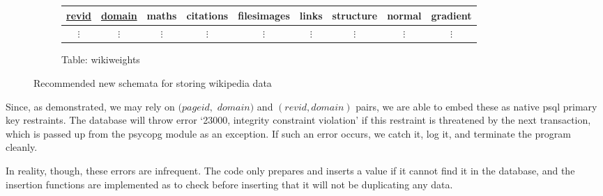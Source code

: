 \begin{figure}
\begin{subfigure}[b!]{\linewidth}
    \centering
    \begin{tabular}{ccccccccc}
      \toprule
      \underline{revid} & \underline{domain} & maths & citations & filesimages & links &
      structure & normal & gradient\\
      \midrule
      $\vdots$ & $\vdots$ & $\vdots$ & $\vdots$ & $\vdots$ & $\vdots$ &
      $\vdots$ & $\vdots$ & $\vdots$ \\
    \end{tabular}
    \caption{Table: wikiweights} 
  \end{subfigure}
  \caption{Recommended new schemata for storing wikipedia data}
  \label{fig:database-new}
\end{figure}

Since, as demonstrated, we may rely on $(pageid,$ $domain)$ and
$(revid,domain)$ pairs, we are able to embed these as native psql
primary key restraints. The database will throw error `23000,
integrity constraint violation' if this restraint is threatened by the
next transaction, which is passed up from the psycopg module as an
exception.\cite{psql-error}\cite{psyc-error} If such an error occurs,
we catch it, log it, and terminate the program cleanly.

In reality, though, these errors are infrequent. The code only
prepares and inserts a value if it cannot find it in the database, and
the insertion functions are implemented as to check before inserting
that it will not be duplicating any data.
